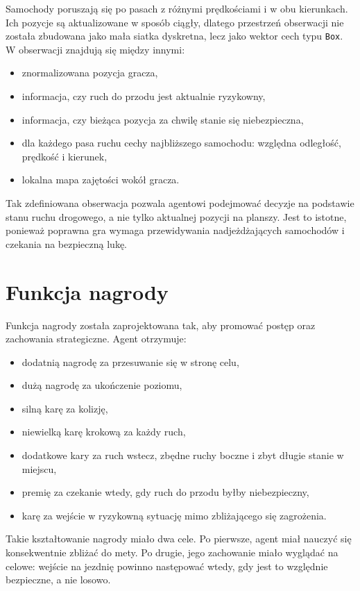 \documentclass[12pt,a4paper]{article}
\begin{document}
Samochody poruszają się po pasach z różnymi prędkościami i w obu kierunkach. Ich pozycje są aktualizowane w sposób ciągły, dlatego przestrzeń obserwacji nie została zbudowana jako mała siatka dyskretna, lecz jako wektor cech typu \texttt{Box}. W obserwacji znajdują się między innymi:
\begin{itemize}
    \item znormalizowana pozycja gracza,
    \item informacja, czy ruch do przodu jest aktualnie ryzykowny,
    \item informacja, czy bieżąca pozycja za chwilę stanie się niebezpieczna,
    \item dla każdego pasa ruchu cechy najbliższego samochodu: względna odległość, prędkość i kierunek,
    \item lokalna mapa zajętości wokół gracza.
\end{itemize}

Tak zdefiniowana obserwacja pozwala agentowi podejmować decyzje na podstawie stanu ruchu drogowego, a nie tylko aktualnej pozycji na planszy. Jest to istotne, ponieważ poprawna gra wymaga przewidywania nadjeżdżających samochodów i czekania na bezpieczną lukę.

\section{Funkcja nagrody}
Funkcja nagrody została zaprojektowana tak, aby promować postęp oraz zachowania strategiczne. Agent otrzymuje:
\begin{itemize}
    \item dodatnią nagrodę za przesuwanie się w stronę celu,
    \item dużą nagrodę za ukończenie poziomu,
    \item silną karę za kolizję,
    \item niewielką karę krokową za każdy ruch,
    \item dodatkowe kary za ruch wstecz, zbędne ruchy boczne i zbyt długie stanie w miejscu,
    \item premię za czekanie wtedy, gdy ruch do przodu byłby niebezpieczny,
    \item karę za wejście w ryzykowną sytuację mimo zbliżającego się zagrożenia.
\end{itemize}

Takie kształtowanie nagrody miało dwa cele. Po pierwsze, agent miał nauczyć się konsekwentnie zbliżać do mety. Po drugie, jego zachowanie miało wyglądać na celowe: wejście na jezdnię powinno następować wtedy, gdy jest to względnie bezpieczne, a nie losowo.
\end{document}
